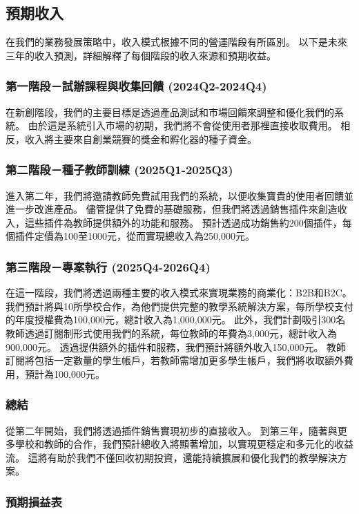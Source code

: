 \subsection{預期收入}

在我們的業務發展策略中，收入模式根據不同的營運階段有所區別。 以下是未來三年的收入預測，詳細解釋了每個階段的收入來源和預期收益。

\subsubsection{第一階段－試辦課程與收集回饋 (2024Q2-2024Q4)}
在新創階段，我們的主要目標是透過產品測試和市場回饋來調整和優化我們的系統。
由於這是系統引入市場的初期，我們將不會從使用者那裡直接收取費用。
相反，收入將主要來自創業競賽的獎金和孵化器的種子資金。

\subsubsection{第二階段－種子教師訓練 (2025Q1-2025Q3)}
進入第二年，我們將邀請教師免費試用我們的系統，以便收集寶貴的使用者回饋並進一步改進產品。
儘管提供了免費的基礎服務，但我們將透過銷售插件來創造收入，這些插件為教師提供額外的功能和服務。
預計透過成功銷售約200個插件，每個插件定價為100至1000元，從而實現總收入為250,000元。

\subsubsection{第三階段－專案執行 (2025Q4-2026Q4)}
在這一階段，我們將透過兩種主要的收入模式來實現業務的商業化：B2B和B2C。
我們預計將與10所學校合作，為他們提供完整的教學系統解決方案，每所學校支付的年度授權費為100,000元，總計收入為1,000,000元。
此外，我們計劃吸引300名教師透過訂閱制形式使用我們的系統，每位教師的年費為3,000元，總計收入為900,000元。
透過提供額外的插件和服務，我們預計將額外收入150,000元。
教師訂閱將包括一定數量的學生帳戶，若教師需增加更多學生帳戶，我們將收取額外費用，預計為100,000元。

\subsubsection{總結}
從第二年開始，我們將透過插件銷售實現初步的直接收入。
到第三年，隨著與更多學校和教師的合作，我們預計總收入將顯著增加，以實現更穩定和多元化的收益流。
這將有助於我們不僅回收初期投資，還能持續擴展和優化我們的教學解決方案。

\subsubsection{預期損益表}

